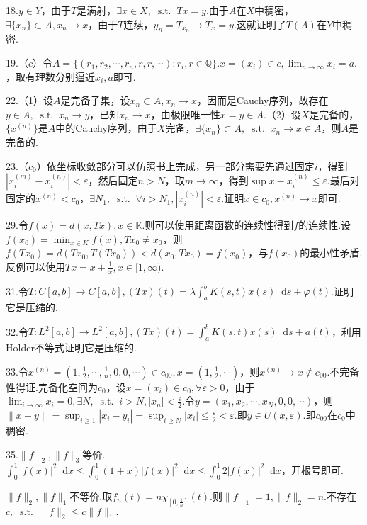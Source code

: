 \documentclass[bwprint, withoutpreface]{cumcmthesis}
\newcommand*{\st}{\mathop{}\!\mathrm{s.t.}\!\mathop{}}
\newcommand*{\dif}{\mathop{}\!\mathrm{d}}
\newcommand*{\norm}[1]{\| #1 \|}
\newcommand*{\nnorm}[2]{\| #1 \|_{#2}}
\begin{document}
18.$y \in Y$，由于$T$是满射，$\exists x \in X, \st Tx = y$.由于$A$在$X$中稠密，$\exists \{x_n\} \subset A, x_n \to x$，由于$T$连续，$y_n = T_{x_n} \to T_x = y$.这就证明了$T(A)$在$Y$中稠密.

19.（$c$）令$A = \{(r_1, r_2, \cdots, r_n, r, r, \cdots): r_i, r \in \mathbb{Q}\}$.$x = (x_i) \in c, \lim_{n \to \infty}{x_i} = a.$，取有理数分别逼近$x_i, a$即可.

22.（1）设$A$是完备子集，设${x_n} \subset A, x_n \to x$，因而是Cauchy序列，故存在$y \in A, \st x_n \to y$，已知$x_n \to x$，由极限唯一性$x = y \in A$.（2）设$X$是完备的，$\{x^{(n)}\}$是$A$中的Cauchy序列，由于$X$完备，$\exists \{x_n\} \subset A, \st x_n \to x \in A$，则$A$是完备的.

23.（$c_0$）依坐标收敛部分可以仿照书上完成，另一部分需要先通过固定$i$，得到$|x_i^{(m)} - x_i^{(n)}| < \varepsilon$，然后固定$n > N$，取$m \to \infty$，得到$\sup{x - x_i^{(n)}} \leqslant \varepsilon$.最后对固定的$x^{(n)} < c_0$，$\exists N_1, \st \forall i > N_1, |x_i^{(n)}| < \varepsilon$.证明$x \in c_0, x^{(n)} \to x$即可.

29.令$f(x) = d(x, Tx), x \in \mathbb{K}$.则可以使用距离函数的连续性得到$f$的连续性.设$f(x_0) = \min_{x \in K}{f(x)}, Tx_0 \neq x_0$，则$f(Tx_0) = d(Tx_0, T(Tx_0)) < d(x_0, Tx_0) = f(x_0)$，与$f(x_0)$的最小性矛盾.反例可以使用$Tx = x + \frac{1}{x}, x \in [1, \infty)$.

31.令$T:C[a, b] \to C[a, b], (Tx)(t) = \lambda \int_{a}^{b} K(s, t) x(s) \dif s + \varphi(t)$.证明它是压缩的.

32.令$T:L^2[a, b] \to L^2[a, b], (Tx)(t) = \int_{a}^{b} K(s, t) x(s) \dif s + a(t)$，利用Holder不等式证明它是压缩的.

33.令$x^{(n)} = (1, \frac{1}{2}, \cdots, \frac{1}{n}, 0, 0, \cdots) \in c_{00}, x = (1, \frac{1}{2}, \cdots)$，则$x^{(n)} \to x \not\in c_{00}$.不完备性得证.完备化空间为$c_0$，设$x = (x_i) \in c_0, \forall \varepsilon > 0$，由于$\lim_{i \to \infty}{x_i} = 0, \exists N, \st i > N, |x_n| < \frac{\varepsilon}{2}$.令$y = (x_1, x_2, \cdots, x_N, 0, 0, \cdots)$，则$\norm{x - y} = \sup_{i \geqslant 1}{|x_i - y_i|} = \sup_{i \geqslant N}{|x_i|} \leqslant \frac{\varepsilon}{2} < \varepsilon$.即$y \in U(x, \varepsilon)$.即$c_{00}$在$c_0$中稠密.

35.$\nnorm{f}{2}, \nnorm{f}{3}$等价.$\int_{0}^{1}{|f(x)|^2 \dif x} \leqslant \int_{0}^{1}{(1 + x)|f(x)|^2 \dif x} \leqslant \int_{0}^{1}{2|f(x)|^2 \dif x}$，开根号即可.

$\nnorm{f}{2}, \nnorm{f}{1}$不等价.取$f_n(t) = n \chi_{[0, \frac{1}{n}]} (t)$.则$\nnorm{f}{1} = 1, \nnorm{f}{2} = n$.不存在$c, \st \nnorm{f}{2} \leqslant c\nnorm{f}{1}.$
\end{document}
